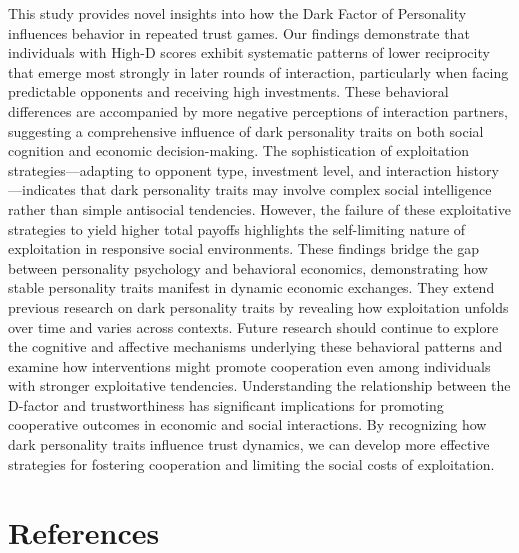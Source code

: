 \documentclass[
]{article}
\begin{document}
This study provides novel insights into how the Dark Factor of Personality influences behavior in repeated trust games. Our findings demonstrate that individuals with High-D scores exhibit systematic patterns of lower reciprocity that emerge most strongly in later rounds of interaction, particularly when facing predictable opponents and receiving high investments. These behavioral differences are accompanied by more negative perceptions of interaction partners, suggesting a comprehensive influence of dark personality traits on both social cognition and economic decision-making.
The sophistication of exploitation strategies---adapting to opponent type, investment level, and interaction history---indicates that dark personality traits may involve complex social intelligence rather than simple antisocial tendencies. However, the failure of these exploitative strategies to yield higher total payoffs highlights the self-limiting nature of exploitation in responsive social environments.
These findings bridge the gap between personality psychology and behavioral economics, demonstrating how stable personality traits manifest in dynamic economic exchanges. They extend previous research on dark personality traits by revealing how exploitation unfolds over time and varies across contexts. Future research should continue to explore the cognitive and affective mechanisms underlying these behavioral patterns and examine how interventions might promote cooperation even among individuals with stronger exploitative tendencies.
Understanding the relationship between the D-factor and trustworthiness has significant implications for promoting cooperative outcomes in economic and social interactions. By recognizing how dark personality traits influence trust dynamics, we can develop more effective strategies for fostering cooperation and limiting the social costs of exploitation.

\pagebreak

\section*{References}\label{references}
\end{document}
